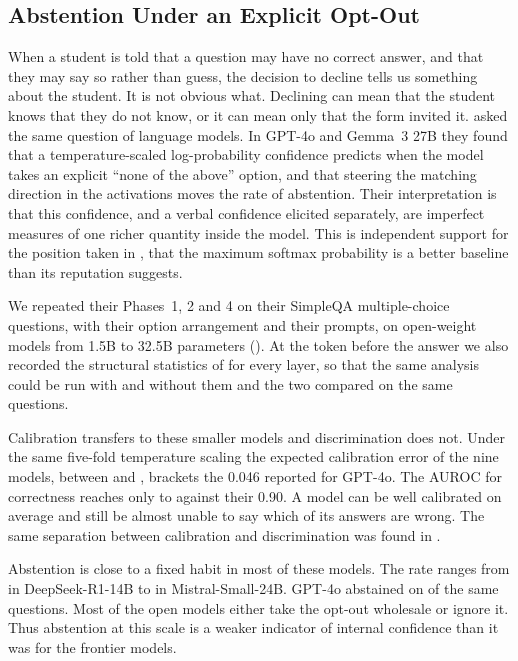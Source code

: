 \documentclass[11pt,a4paper]{article}
\begin{document}
\subsection{Abstention Under an Explicit Opt-Out}
\label{sec:readout}

When a student is told that a question may have no correct answer, and
that they may say so rather than guess, the decision to decline tells us
something about the student.  It is not obvious what.  Declining can mean
that the student knows that they do not know, or it can mean only that
the form invited it.  \citet{kumaran2026causal} asked the same question
of language models.  In GPT-4o and Gemma~3 27B they found that a
temperature-scaled log-probability confidence predicts when the model
takes an explicit ``none of the above'' option, and that steering the
matching direction in the activations moves the rate of abstention.
Their interpretation is that this confidence, and a verbal confidence
elicited separately, are imperfect measures of one richer quantity inside
the model.  This is independent support for the position taken in
, that the maximum softmax probability is a better
baseline than its reputation suggests.

We repeated their Phases~1, 2 and 4 on their \readoutNQuestions{} SimpleQA
multiple-choice questions, with their option arrangement and their
prompts, on \readoutNModels{} open-weight models from 1.5B to 32.5B
parameters ().  At the token before the answer we also
recorded the structural statistics of  for every
layer, so that the same analysis could be run with and without them and
the two compared on the same questions.

Calibration transfers to these smaller models and discrimination does
not.  Under the same five-fold temperature scaling the expected
calibration error of the nine models, between \readoutEceMin{} and
\readoutEceMax{}, brackets the 0.046 reported for GPT-4o.  The AUROC for
correctness reaches only \readoutAurocMin{} to \readoutAurocMax{} against
their 0.90.  A model can be well calibrated on average and still be almost
unable to say which of its answers are wrong.  The same separation between
calibration and discrimination was found in .

Abstention is close to a fixed habit in most of these models.  The rate
ranges from \readoutAbstainMin{} in DeepSeek-R1-14B to
\readoutAbstainMax{} in Mistral-Small-24B.  GPT-4o abstained on
\readoutKumaranAbstain{} of the same questions.  Most of the open models
either take the opt-out wholesale or ignore it.  Thus abstention at this
scale is a weaker indicator of internal confidence than it was for the
frontier models.
\end{document}
